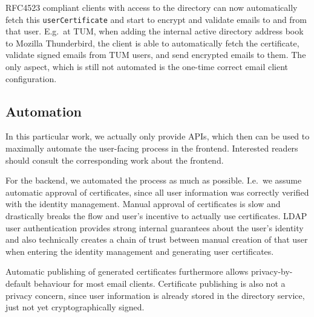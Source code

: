 RFC4523 compliant clients with access to the directory can now automatically fetch this \lstinline{userCertificate} and
start to encrypt and validate emails to and from that user.
E.g.\ at TUM, when adding the internal active directory address book to Mozilla Thunderbird, the client is able to
automatically fetch the certificate, validate signed emails from TUM users, and send encrypted emails to them.
The only aspect, which is still not automated is the one-time correct email client configuration.

\subsection*{Automation}
In this particular work, we actually only provide APIs, which then can be used to maximally automate the user-facing
process in the frontend.
Interested readers should consult the corresponding work about the frontend.

For the backend, we automated the process as much as possible.
I.e.\ we assume automatic approval of certificates, since all user information was correctly verified with the identity
management.
Manual approval of certificates is slow and drastically breaks the flow and user's incentive to actually use
certificates.
LDAP user authentication provides strong internal guarantees about the user's identity and also technically creates a
chain of trust between manual creation of that user when entering the identity management and generating user
certificates.

Automatic publishing of generated certificates furthermore allows privacy-by-default behaviour for most email clients.
Certificate publishing is also not a privacy concern, since user information is already stored in the directory service,
just not yet cryptographically signed.
